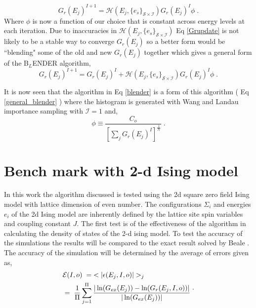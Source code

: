 \documentclass[aps,prl,reprint,superscriptaddress,showkeys]{revtex4-1}
\begin{document}
 \begin{equation}
 G_r(E_j)^{I+1} = \mathcal{H}(E_j,\{e_s\}_{\mathcal{S}\times\mathcal{I}}) G_r(E_j)^I  \phi \;.
 \label{Grupdate}
 \end{equation}
Where $\phi$ is now a function of our choice that is constant across energy levels at each iteration. Due to inaccuracies in $\mathcal{H}(E_j,\{e_s\}_{\mathcal{S}\times\mathcal{I}})$ Eq \ref{Grupdate} is not likely to be a stable way to converge $G_r(E_j)$ so a better form would be ``blending"  some of the old and new $G_r(E_j)$ together which gives a general form of the B$_L$ENDER algorithm, 
\begin{equation}
G_r(E_j)^{I+1} = G_r(E_j)^I   +    \mathcal{H}(E_j,\{e_s\}_{\mathcal{S}\times\mathcal{I}}) G_r(E_j)^I  \phi \;.
\label{general_blender}
\end{equation}

It is now seen that the algorithm in Eq \ref{blender} is a form of this algorithm ( Eq \ref{general_blender} ) where the histogram is generated with Wang and Landau importance sampling with $\mathcal{I} = 1 $ and,
\begin{equation}
\phi \equiv  \frac{C_o  }{ [\sum_j G_{r}(E_j)^{I}]^{\frac{1}{N} } } \;.
\end{equation}


\section{Bench mark with 2-d Ising model}
In this work the algorithm discussed is tested using the 2d square zero field  Ising model with lattice dimension of even number\cite{exact_statistical,Onsager,Ising}.  The configurations $\Sigma_i$ and energies $e_i$ of the 2d Ising model are inherently defined by the lattice site spin variables and coupling constant $J$.   The first test is of the effectiveness of the algorithm in calculating the density of states of the 2-d ising model.  To test the accuracy of the simulations the results will be compared to the exact result solved by Beale \cite{Beale_2d_ising}. The accuracy of the simulation will be determined by the average of errors given as, 
\begin{equation}
\begin{split}
 &\mathcal{E}(I,o) \hspace{0.1cm}= \hspace{0.1cm}< |\epsilon(E_j,I,o)| >_j\\
& = \hspace{0.1cm}  \frac{1}{\Pi} \sum_{j=1}^{\Pi}\frac{|\ln(G_{ex}(E_j))- \ln(G_{r}(E_j,I,o))|}{|\ln(G_{ex}(E_j))|}\; 
 \end{split}. 
 \label{avg_error}
\end{equation}
\end{document}
